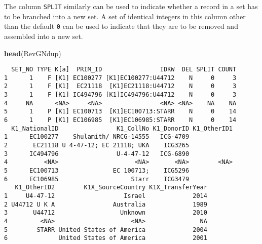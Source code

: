 \documentclass[]{article}
\newenvironment{Shaded}{\begin{snugshade}}{\end{snugshade}}
\newcommand{\CommentTok}[1]{\textcolor[rgb]{0.56,0.35,0.01}{\textit{#1}}}
\newcommand{\DataTypeTok}[1]{\textcolor[rgb]{0.13,0.29,0.53}{#1}}
\newcommand{\DecValTok}[1]{\textcolor[rgb]{0.00,0.00,0.81}{#1}}
\newcommand{\KeywordTok}[1]{\textcolor[rgb]{0.13,0.29,0.53}{\textbf{#1}}}
\newcommand{\NormalTok}[1]{#1}
\newcommand{\OperatorTok}[1]{\textcolor[rgb]{0.81,0.36,0.00}{\textbf{#1}}}
\newcommand{\OtherTok}[1]{\textcolor[rgb]{0.56,0.35,0.01}{#1}}
\newcommand{\StringTok}[1]{\textcolor[rgb]{0.31,0.60,0.02}{#1}}
\begin{document}
The column \texttt{SPLIT} similarly can be used to indicate whether a
record in a set has to be branched into a new set. A set of identical
integers in this column other than the default \texttt{0} can be used to
indicate that they are to be removed and assembled into a new set.

\begin{Shaded}
\end{Shaded}

\begin{Shaded}
\begin{Highlighting}[]
\KeywordTok{head}\NormalTok{(RevGNdup)}
\end{Highlighting}
\end{Shaded}

\begin{verbatim}
  SET_NO TYPE K[a]  PRIM_ID                IDKW  DEL SPLIT COUNT
1      1    F [K1] EC100277 [K1]EC100277:U44712    N     0     3
2      1    F [K1]  EC21118  [K1]EC21118:U44712    N     0     3
3      1    F [K1] IC494796 [K1]IC494796:U44712    N     0     3
4     NA      <NA>     <NA>                <NA> <NA>    NA    NA
5      1    P [K1] EC100713  [K1]EC100713:STARR    N     0    14
6      1    P [K1] EC106985  [K1]EC106985:STARR    N     0    14
  K1_NationalID                K1_CollNo K1_DonorID K1_OtherID1
1      EC100277    Shulamith/ NRCG-14555   ICG-4709            
2       EC21118 U 4-47-12; EC 21118; UKA    ICG3265            
3      IC494796                U-4-47-12   ICG-6890            
4          <NA>                     <NA>       <NA>        <NA>
5      EC100713               EC 100713;    ICG5296            
6      EC106985                    Starr    ICG3479            
   K1_OtherID2        K1X_SourceCountry K1X_TransferYear
1     U4-47-12                   Israel             2014
2 U44712 U K A                Australia             1989
3       U44712                  Unknown             2010
4         <NA>                     <NA>               NA
5        STARR United States of America             2004
6              United States of America             2001
\end{verbatim}
\end{document}
